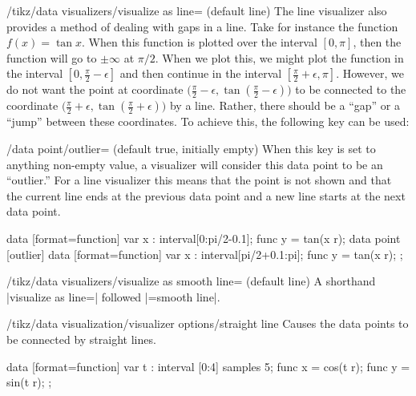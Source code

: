 \begin{key}{/tikz/data visualizers/visualize as line= (default line)}
  The line visualizer also provides a method of dealing with gaps in a
  line. Take for instance the function $f(x) = \tan x$. When this
  function is plotted over the interval $[0,\pi]$, then the function
  will go to $\pm \infty$ at $\pi/2$. When we plot this, we might plot
  the function in the interval $[0,\frac{\pi}{2}-\epsilon]$ and then
  continue in the interval $[\frac{\pi}{2}+\epsilon,\pi]$. However, we
  do not want the point at coordinate $\bigl(\frac{\pi}{2}- \epsilon,
  \tan(\frac{\pi}{2}- \epsilon)\bigr)$ to be connected to the
  coordinate $\bigl(\frac{\pi}{2}+ \epsilon, \tan(\frac{\pi}{2}+
  \epsilon)\bigr)$ by a line. Rather, there should be a ``gap'' or a
  ``jump'' between these coordinates. To achieve this, the following
  key can be used:
  \begin{key}{/data point/outlier= (default true, initially \normalfont empty)}
    When this key is set to anything non-empty value, a visualizer
    will consider this data point to be an ``outlier.'' For a line
    visualizer this means that the point is not shown and that the
    current line ends at the previous data point and a new line starts
    at the next data point.
\begin{codeexample}[width=7cm]
\tikz \datavisualization
 [scientific axes=clean, x axis={grid={major at=(pi/2)}},
  visualize as smooth line]
data [format=function] {
  var x : interval[0:pi/2-0.1];
  func y = tan(\value x r);
}
data point [outlier]
data [format=function] {
  var x : interval[pi/2+0.1:pi];
  func y = tan(\value x r);
};
\end{codeexample}
  \end{key}
\end{key}


\begin{key}{/tikz/data visualizers/visualize as smooth line= (default line)}
  A shorthand |visualize as line=|
  followed |=smooth line|.
\end{key}


\begin{key}{/tikz/data visualization/visualizer options/straight line}
  Causes the data points to be connected by straight lines.
\begin{codeexample}[]
\tikz [scale=.55] \datavisualization
 [scientific axes=clean, all axes={ticks=few},
  visualize as smooth line=my data,  my data={straight line}]
data [format=function] {
  var t : interval [0:4] samples 5;
  func x = cos(\value t r);
  func y = sin(\value t r);
};
\end{codeexample}
\end{key}

